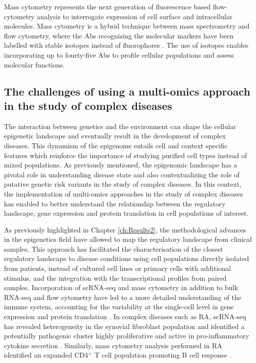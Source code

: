 Mass cytometry represents the next generation of fluorescence based flow-cytometry analysis to interrogate expression of cell surface and intracellular molecules. Mass cytometry is a hybrid technique between mass spectrometry and flow cytometry, where the Abs recognising the molecular markers have been labelled with stable isotopes instead of fluorophores \parencite{Bandura2009}. The use of isotopes enables incorporating up to fourty-five Abs to profile cellular populations and assess molecular functions. 



\subsection{The challenges of using a multi-omics approach in the study of complex diseases}

The interaction between genetics and the environment can shape the cellular epigenetic landscape and eventually result in the development of complex diseases. This dynamism of the epigenome entails cell and context specific features which reinforce the importance of studying purified cell types instead of mixed populations. As previously mentioned, the epigenomic landscape has a pivotal role in understanding disease state and also contextualizing the role of putative genetic risk variants in the study of complex diseases. In this context, the implementation of multi-omics approaches in the study of complex diseases has enabled to better understand the relationship between the regulatory landscape, gene expression and protein translation in cell populations of interest. 

As previously highlighted in Chapter \ref{ch:Results2}, the methodological advances in the epigenetics field have allowed to map the regulatory landscape from clinical samples. This approach has facilitated the characterisation of the closest regulatory landscape to disease conditions using cell populations directly isolated from patients, instead of cultured cell lines or primary cells with additional stimulus, and the integration with the transcriptional profiles from paired samples. Incorporation of scRNA-seq and mass cytometry in addition to bulk RNA-seq and flow cytometry have led to a more detailed understanding of the immune system, accounting for the variability at the single-cell level in gene expression and protein translation \parencite{Jaitin2014, Villani2017,Bengsch2018}. In complex diseases such as RA, scRNA-seq has revealed heterogeneity in the synovial fibroblast population and identified a potentially pathogenic cluster highly proliferative and active in pro-inflammatory cytokine secretion \parencite{Mizoguchi2018}. Similarly, mass cytometry analysis performed in RA identified an expanded CD4$^+$ T cell population promoting B cell response \parencite{Rao2017}.



